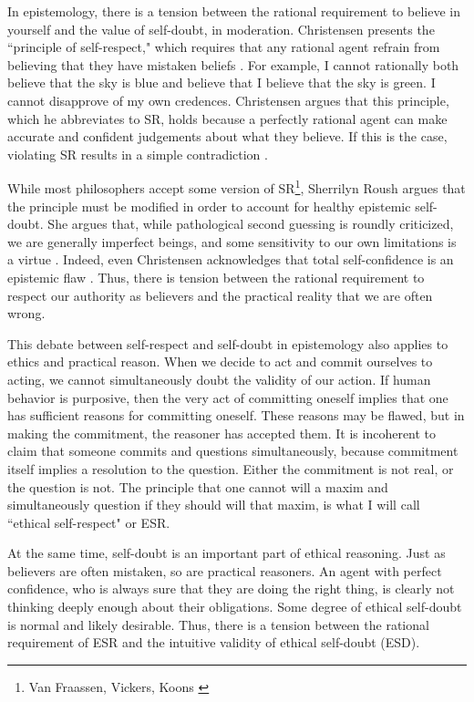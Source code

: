 \begin{isabellebody}
\begin{isamarkuptext}
In epistemology, there is a tension between the rational requirement to believe in yourself and the 
value of self-doubt, in moderation. Christensen presents the ``principle of self-respect," which requires 
that any rational agent refrain from believing that they have mistaken beliefs \cite[4]{christensen}. For example, I cannot 
rationally both believe that the sky is blue and believe that I believe that the sky is green. I cannot 
disapprove of my own credences. Christensen argues that this principle, which he abbreviates to SR, holds because 
a perfectly rational agent can make accurate and confident judgements about what they believe. If this 
is the case, violating SR results in a simple contradiction \cite[8-9]{christensen}. 

While most philosophers accept some version of SR\footnote{Van Fraassen, Vickers, Koons \cite[5]{christensen}}, 
Sherrilyn Roush argues that the principle must be modified in order to account for healthy epistemic 
self-doubt. She argues that, while pathological second guessing is roundly criticized, we are generally 
imperfect beings, and some sensitivity to our own limitations is a virtue \cite[2]{roushselfhelp}. Indeed, even Christensen 
acknowledges that total self-confidence is an epistemic flaw \cite[1]{christensen}. Thus, there is tension between the rational
requirement to respect our authority as believers and the practical reality that we are often wrong. 

This debate between self-respect and self-doubt in epistemology also applies to ethics and practical 
reason. When we decide to act and commit ourselves to acting, we cannot simultaneously doubt the 
validity of our action. If human behavior is purposive, then the very act of committing oneself implies 
that one has sufficient reasons for committing oneself. These reasons may be flawed, but in making the 
commitment, the reasoner has accepted them. It is incoherent to claim that someone commits and questions 
simultaneously, because commitment itself implies a resolution to the question. Either the commitment 
is not real, or the question is not. The principle that 
one cannot will a maxim and simultaneously question if they should will that maxim, is what I will call 
``ethical self-respect" or ESR.

At the same time, self-doubt is an important part of ethical reasoning. Just as believers are often 
mistaken, so are practical reasoners. An agent with perfect confidence, who is always sure that they 
are doing the right thing, is clearly not thinking deeply enough about their obligations. Some degree
of ethical self-doubt is normal and likely desirable. Thus, there is a tension between the rational
requirement of ESR and the intuitive validity of ethical self-doubt (ESD).


\end{isamarkuptext}
\end{isabellebody}

